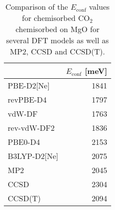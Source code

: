 \begin{table}
\caption{\label{tab:econf_co2}Comparison of the $E_\textrm{conf}$ values for chemisorbed CO$_2$ chemisorbed on MgO for several DFT models as well as MP2, CCSD and CCSD(T).}
\begin{tabular}{lr}
\toprule
 & $E_\textrm{conf}$ [meV] \\ 
\midrule
PBE-D2[Ne] & 1841 \\
revPBE-D4 & 1797 \\
vdW-DF & 1763 \\
rev-vdW-DF2 & 1836 \\
PBE0-D4 & 2153 \\
B3LYP-D2[Ne] & 2075 \\
MP2 & 2045 \\
CCSD & 2304 \\
CCSD(T) & 2094 \\
\bottomrule
\end{tabular}
\end{table}